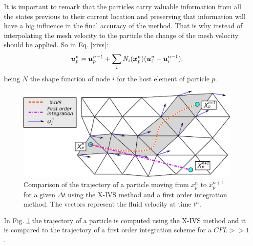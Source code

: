 It is important to remark that the particles carry valuable information from all the states previous to their current location and preserving that information will have a big influence in the final accuracy of the method. That is why instead of interpolating the mesh velocity to the particle the change of the mesh velocity should be applied. So in Eq. \ref{xivs}:
%
\begin{equation}\label{eq:partcor}
  \boldsymbol{u}_p^{n}=\boldsymbol{u}_p^{n-1}+\sum_{i}N_i(\boldsymbol{x}_p^n)(\boldsymbol{u}_i^n-\boldsymbol{u}_i^{n-1}).
\end{equation}
%
being $N$ the shape function of node $i$ for the host element of particle $p$.
\begin{figure}[htp] 
\centering 
\includegraphics[scale=.6]{./imgs/xivs.eps}
\caption{Comparison of the trajectory of a particle moving from $x_p^n$ to $x_p^{n+1}$ for a given $\Delta t$ using the X-IVS method and a first order integration method. The vectors represent the fluid velocity at time $t^n$.}
\label{fig:xivs}
\end{figure}
%
In Fig. \ref{fig:xivs} the trajectory of a particle is computed using the X-IVS method and it is compared to the trajectory of a first order integration scheme for a $CFL>>1$. 

